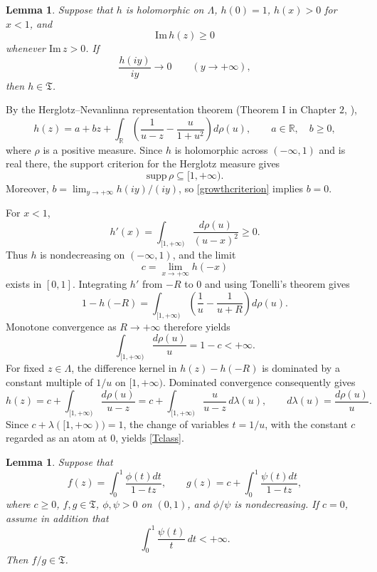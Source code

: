 \documentclass[12pt,a4paper]{amsart}
\makeatletter
\numberwithin{equation}{section}
\renewenvironment{proof}[1][Proof]{%
  \par\pushQED{\qed}%
  \normalfont\topsep6\p@\@plus6\p@\relax
  \trivlist
  \item[\hskip\labelsep\bfseries #1:]\ignorespaces
}{%
  \popQED\endtrivlist\@endpefalse
}
\theoremstyle{plain}
\newtheorem{lem}[Thm]{Lemma}
\theoremstyle{definition}
\makeatother
\begin{document}
\begin{lem}\label{Stieltjescriterion}
Suppose that $h$ is holomorphic on $\Lambda$, $h(0)=1$, $h(x)>0$ for $x<1$, and
\[
\mathrm{Im}\,h(z)\geq 0
\]
whenever $\mathrm{Im}\,z>0$.  If
\begin{equation}\label{growthcriterion}
\frac{h(iy)}{iy}\rightarrow 0
\qquad (y\rightarrow+\infty),
\end{equation}
then $h\in\mathfrak{T}$.
\end{lem}

\begin{proof}
By the Herglotz--Nevanlinna representation theorem (Theorem I in Chapter $2$, \cite{Donoghue1974}),
\[
h(z)=a+bz+\int_{\mathbb{R}}
\left(\frac1{u-z}-\frac{u}{1+u^2}\right)d\rho(u),
\qquad a\in\mathbb{R},\quad b\geq 0,
\]
where $\rho$ is a positive measure.  Since $h$ is holomorphic across $(-\infty,1)$ and is real there, the support criterion for the Herglotz measure gives
\[
\mathrm{supp}\,\rho\subseteq[1,+\infty).
\]
Moreover, $b=\lim_{y\rightarrow+\infty}h(iy)/(iy)$, so \eqref{growthcriterion} implies $b=0$.

For $x<1$,
\[
h'(x)=\int_{[1,+\infty)}\frac{d\rho(u)}{(u-x)^2}\geq 0.
\]
Thus $h$ is nondecreasing on $(-\infty,1)$, and the limit
\[
c=\lim_{x\rightarrow+\infty}h(-x)
\]
exists in $[0,1]$.  Integrating $h'$ from $-R$ to $0$ and using Tonelli's theorem gives
\[
1-h(-R)=\int_{[1,+\infty)}
\left(\frac1u-\frac1{u+R}\right)d\rho(u).
\]
Monotone convergence as $R\rightarrow+\infty$ therefore yields
\[
\int_{[1,+\infty)}\frac{d\rho(u)}u=1-c<+\infty.
\]
For fixed $z\in\Lambda$, the difference kernel in $h(z)-h(-R)$ is dominated by a constant multiple of $1/u$ on $[1,+\infty)$.  Dominated convergence consequently gives
\[
h(z)=c+\int_{[1,+\infty)}\frac{d\rho(u)}{u-z}
=c+\int_{[1,+\infty)}\frac{u}{u-z}\,d\lambda(u),
\qquad d\lambda(u)=\frac{d\rho(u)}u.
\]
Since $c+\lambda([1,+\infty))=1$, the change of variables $t=1/u$, with the constant $c$ regarded as an atom at $0$, yields \eqref{Tclass}.
\end{proof}

\begin{lem}\label{quotientlemma}
Suppose that
\[
f(z)=\int_0^1\frac{\phi(t)dt}{1-tz},
\qquad
g(z)=c+\int_0^1\frac{\psi(t)dt}{1-tz},
\]
where $c\geq 0$, $f,g\in\mathfrak{T}$, $\phi,
\psi>0$ on $(0,1)$, and $\phi/\psi$ is nondecreasing.  If $c=0$, assume in addition that
\begin{equation}\label{psiintegrable}
\int_0^1\frac{\psi(t)}t\,dt<+\infty.
\end{equation}
Then $f/g\in\mathfrak{T}$.
\end{lem}
\end{document}
